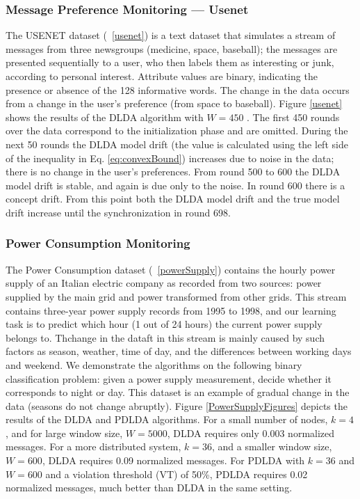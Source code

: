 \documentclass{vldb}
\begin{document}
\subsubsection{Message Preference Monitoring --- Usenet}
The USENET dataset (~\ref{usenet}) is a text dataset that simulates a stream of messages 
from three newsgroups (medicine, space, baseball); 
the messages are presented sequentially to a user, who then labels them as interesting or junk, 
according to personal interest. 
Attribute values are binary, indicating the presence or absence of the 128 informative words. 
The change in the data occurs from a change in the user's preference (from space to baseball). 
Figure \ref{usenet} shows the results of the DLDA algorithm with $W=450$ . The first 450 rounds over the data correspond to
the initialization phase and are omitted. During the next 50 rounds the DLDA model drift 
(the value is calculated using the left side of the inequality in Eq. \ref{eq:convexBound}) 
increases due to noise in the data; there is no change in the user's
preferences.
From round 500 to 600 the DLDA model drift is stable, and again is due only to the noise. In round 600 there is a concept
drift.
From this point both the DLDA model drift and the true model drift increase until the synchronization in round 698.
\subsubsection{Power Consumption Monitoring}
The Power Consumption dataset  (~\ref{powerSupply}) contains the hourly power supply of an
Italian electric company as recorded from two sources: power supplied
by the main grid and power transformed from other grids.
This stream contains three-year power supply records
from 1995 to 1998, and our learning task is to predict which hour (1 out of 24 hours) 
the current power supply belongs to. 
Thchange in the dataft in this stream is mainly caused by such factors as season, weather, time of day,
and the differences between working days and weekend.
We demonstrate the algorithms on the following binary classification problem:
given a power supply measurement, decide whether it corresponds to night or day.
This dataset is an example of gradual change in the data (seasons do not
change abruptly).
Figure \ref{PowerSupplyFigures} depicts the results of the DLDA
and PDLDA algorithms. For a small number of nodes, $k=4$, and for large
window size, $W=5000$, DLDA requires only 0.003 normalized messages.
For a more distributed system, $k=36$, and a smaller window
size, $W=600$, DLDA requires 0.09 normalized messages. For PDLDA with
$k=36$ and $W=600$ and a violation threshold (VT) of 50\%, PDLDA
requires 0.02 normalized messages, much better than DLDA in the same setting.
\end{document}
